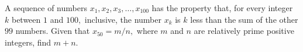 A sequence of numbers $x_{1},x_{2},x_{3},\ldots,x_{100}$ has the property that, for every integer $k$ between $1$ and $100,$ inclusive, the number $x_{k}$ is $k$ less than the sum of the other $99$ numbers. Given that $x_{50}=m/n,$ where $m$ and $n$ are relatively prime positive integers, find $m+n.$